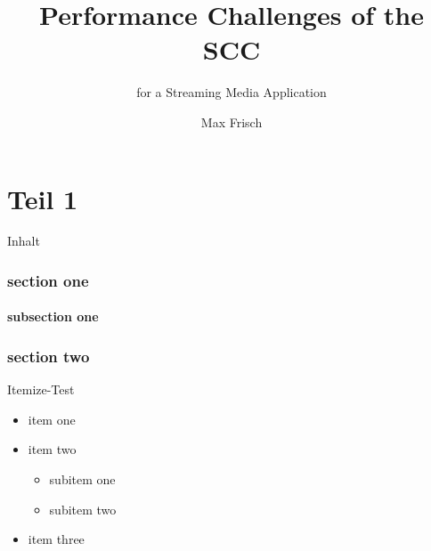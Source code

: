 \documentclass{beamer}
\begin{document}
\title{Performance Challenges of the SCC}
\subtitle{for a Streaming Media Application}
\author{Max Frisch}


\begin{frame}[plain]
  \titlepage
\end{frame}


\part{Teil 1}

\begin{frame}
  \partpage
\end{frame}


\begin{frame}{Inhalt}
  \tableofcontents
\end{frame}

\section{section one}
\subsection{subsection one}
\section{section two}

\begin{frame}{Itemize-Test}
  \begin{itemize}
    \item item one
    \item item two
    \begin{itemize}
      \item subitem one
      \item subitem two
    \end{itemize}
    \item item three
  \end{itemize}
\end{frame}


\end{document}
